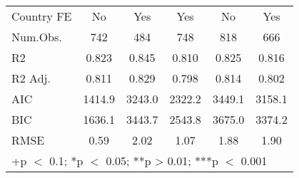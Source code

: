 \begin{table}
\begin{tabular}[t]{lccccc}
\midrule
Country FE & No & Yes & Yes & No & Yes\\
Num.Obs. & 742 & 484 & 748 & 818 & 666\\
R2 & 0.823 & 0.845 & 0.810 & 0.825 & 0.816\\
R2 Adj. & 0.811 & 0.829 & 0.798 & 0.814 & 0.802\\
AIC & 1414.9 & 3243.0 & 2322.2 & 3449.1 & 3158.1\\
BIC & 1636.1 & 3443.7 & 2543.8 & 3675.0 & 3374.2\\
RMSE & 0.59 & 2.02 & 1.07 & 1.88 & 1.90\\
\bottomrule
\multicolumn{6}{l}{\rule{0pt}{1em}+p $<$ 0.1; *p $<$ 0.05; **p > 0.01; ***p $<$ 0.001}\\
\end{tabular}
\end{table}
